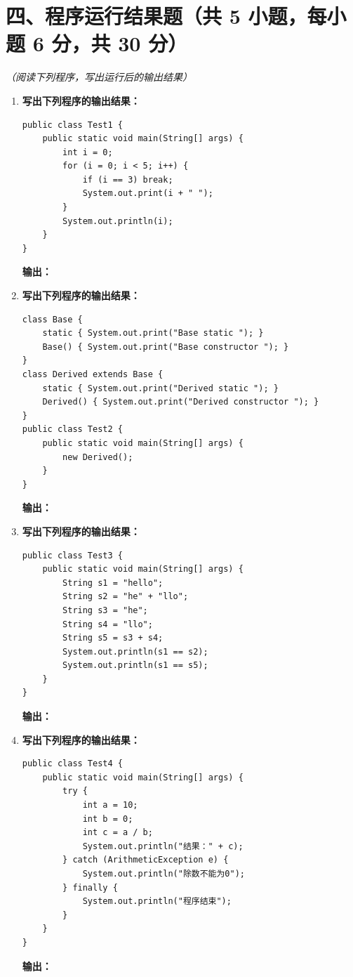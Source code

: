 \documentclass[a3paper, landscape, 11pt, twocolumn]{article}
\begin{document}
\vspace{0.5cm}

\section*{四、程序运行结果题（共 5 小题，每小题 6 分，共 30 分）}
\textit{（阅读下列程序，写出运行后的输出结果）}

\begin{enumerate}[leftmargin=*, label=\arabic*., itemsep=1em]
	\item \textbf{写出下列程序的输出结果：}
	      \begin{lstlisting}[style=JavaExam]
public class Test1 {
    public static void main(String[] args) {
        int i = 0;
        for (i = 0; i < 5; i++) {
            if (i == 3) break;
            System.out.print(i + " ");
        }
        System.out.println(i);
    }
}
\end{lstlisting}
	      \textbf{输出：}\underline{\hspace{6cm}}

	\item \textbf{写出下列程序的输出结果：}
	      \begin{lstlisting}[style=JavaExam]
class Base {
    static { System.out.print("Base static "); }
    Base() { System.out.print("Base constructor "); }
}
class Derived extends Base {
    static { System.out.print("Derived static "); }
    Derived() { System.out.print("Derived constructor "); }
}
public class Test2 {
    public static void main(String[] args) {
        new Derived();
    }
}
\end{lstlisting}
	      \textbf{输出：}\underline{\hspace{6cm}}

	\item \textbf{写出下列程序的输出结果：}
	      \begin{lstlisting}[style=JavaExam]
public class Test3 {
    public static void main(String[] args) {
        String s1 = "hello";
        String s2 = "he" + "llo";
        String s3 = "he";
        String s4 = "llo";
        String s5 = s3 + s4;
        System.out.println(s1 == s2);
        System.out.println(s1 == s5);
    }
}
\end{lstlisting}
	      \textbf{输出：}\underline{\hspace{6cm}}

	\item \textbf{写出下列程序的输出结果：}
	      \begin{lstlisting}[style=JavaExam]
public class Test4 {
    public static void main(String[] args) {
        try {
            int a = 10;
            int b = 0;
            int c = a / b;
            System.out.println("结果：" + c);
        } catch (ArithmeticException e) {
            System.out.println("除数不能为0");
        } finally {
            System.out.println("程序结束");
        }
    }
}
\end{lstlisting}
	      \textbf{输出：}\underline{\hspace{6cm}}


\end{enumerate}
\end{document}
